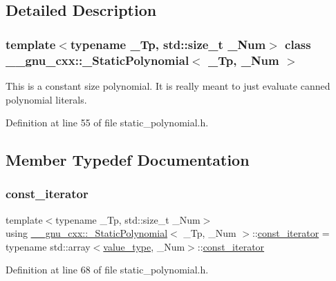 \subsection{Detailed Description}
\subsubsection*{template$<$typename \+\_\+\+Tp, std\+::size\+\_\+t \+\_\+\+Num$>$\newline
class \+\_\+\+\_\+gnu\+\_\+cxx\+::\+\_\+\+Static\+Polynomial$<$ \+\_\+\+Tp, \+\_\+\+Num $>$}

This is a constant size polynomial. It is really meant to just evaluate canned polynomial literals. 

Definition at line 55 of file static\+\_\+polynomial.\+h.



\subsection{Member Typedef Documentation}
\mbox{\label{class____gnu__cxx_1_1__StaticPolynomial_a6fac29559236e7576f7e35b03d35ee08}} 
\subsubsection{\texorpdfstring{const\+\_\+iterator}{const\_iterator}}
{\footnotesize\ttfamily template$<$typename \+\_\+\+Tp, std\+::size\+\_\+t \+\_\+\+Num$>$ \\
using \hyperlink{class____gnu__cxx_1_1__StaticPolynomial}{\+\_\+\+\_\+gnu\+\_\+cxx\+::\+\_\+\+Static\+Polynomial}$<$ \+\_\+\+Tp, \+\_\+\+Num $>$\+::\hyperlink{class____gnu__cxx_1_1__StaticPolynomial_a6fac29559236e7576f7e35b03d35ee08}{const\+\_\+iterator} =  typename std\+::array$<$\hyperlink{class____gnu__cxx_1_1__StaticPolynomial_af23110f5a002cd6caa3542df7cf35284}{value\+\_\+type}, \+\_\+\+Num$>$\+::\hyperlink{class____gnu__cxx_1_1__StaticPolynomial_a6fac29559236e7576f7e35b03d35ee08}{const\+\_\+iterator}}



Definition at line 68 of file static\+\_\+polynomial.\+h.

